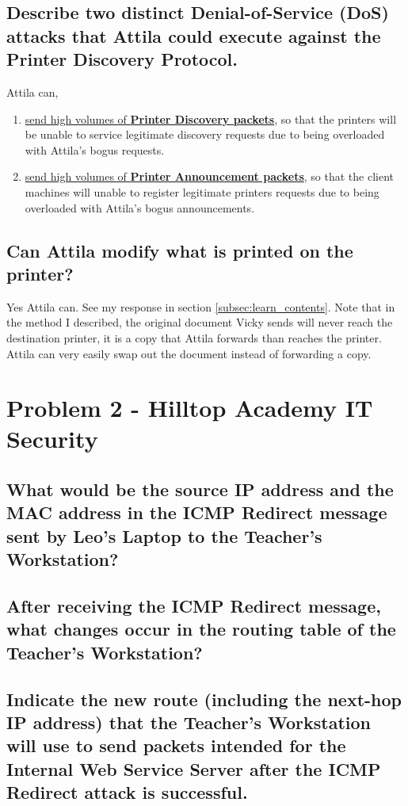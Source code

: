 \documentclass{article}
\begin{document}
\subsection{Describe two distinct Denial-of-Service (DoS) attacks that Attila could execute
against the Printer Discovery Protocol.}
	Attila can,
	\begin{enumerate}
		\item \underline{send high volumes of \textbf{Printer Discovery packets}}, so that the printers will be unable to service legitimate
		discovery requests due to being overloaded with Attila's bogus requests.
		\item \underline{send high volumes of \textbf{Printer Announcement packets}}, so that the client machines will unable to register legitimate 
		printers requests due to being overloaded with Attila's bogus announcements.
	\end{enumerate}

\subsection{Can Attila modify what is printed on the printer?}
	Yes Attila can. See my response in section \ref{subsec:learn_contents}. Note that in the method I described, the 
	original document Vicky sends will never reach the destination printer, it is a copy that Attila forwards than reaches the printer.
	Attila can very easily swap out the document instead of forwarding a copy.

\section{Problem 2 - Hilltop Academy IT Security}
\label{sec:hilltop}

\subsection{What would be the source IP address and the MAC address in the ICMP
Redirect message sent by Leo’s Laptop to the Teacher’s Workstation?}

\subsection{After receiving the ICMP Redirect message, what changes occur in the routing
table of the Teacher’s Workstation?}

\subsection{Indicate the new route (including the next-hop IP address) that the Teacher’s
Workstation will use to send packets intended for the Internal Web Service Server after
the ICMP Redirect attack is successful.}
\end{document}

